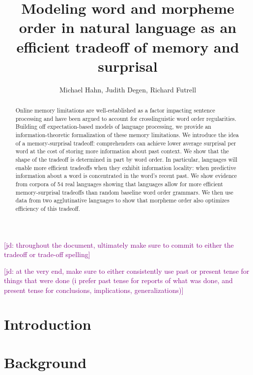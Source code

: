 \documentclass[11pt,letterpaper]{article}
\title{Modeling word and morpheme order in natural language as an efficient tradeoff of memory and surprisal}
\author{Michael Hahn, Judith Degen, Richard Futrell}
\newcommand{\jd}[1]{\textcolor{Purple}{[jd: #1]}}
\begin{document}
\maketitle


\begin{abstract}
Online memory limitations are well-established as a factor impacting sentence processing and have been argued to account for crosslinguistic word order regularities. Building off expectation-based models of language processing, we provide an information-theoretic formalization of these memory limitations. We introduce the idea of a memory-surprisal tradeoff: comprehenders can achieve lower average surprisal per word at the cost of storing more information about past context. We show that the shape of the tradeoff is determined in part by word order. In particular, languages will enable more efficient tradeoffs when they exhibit information locality: when predictive information about a word is concentrated in the word’s recent past. We show evidence from corpora of 54 real languages showing that languages allow for more efficient memory-surprisal tradeoffs than random baseline word order grammars. 
We then use data from two agglutinative languages to show that morpheme order also optimizes efficiency of this tradeoff.
\end{abstract}


% 

 \jd{throughout the document, ultimately make sure to commit to either the tradeoff or trade-off spelling}
 
 \jd{at the very end, make sure to either consistently use past or present tense for things that were done (i prefer past tense for reports of what was done, and present tense for conclusions, implications, generalizations)}
 
\section{Introduction}





\section{Background}\label{sec:background}
\end{document}
